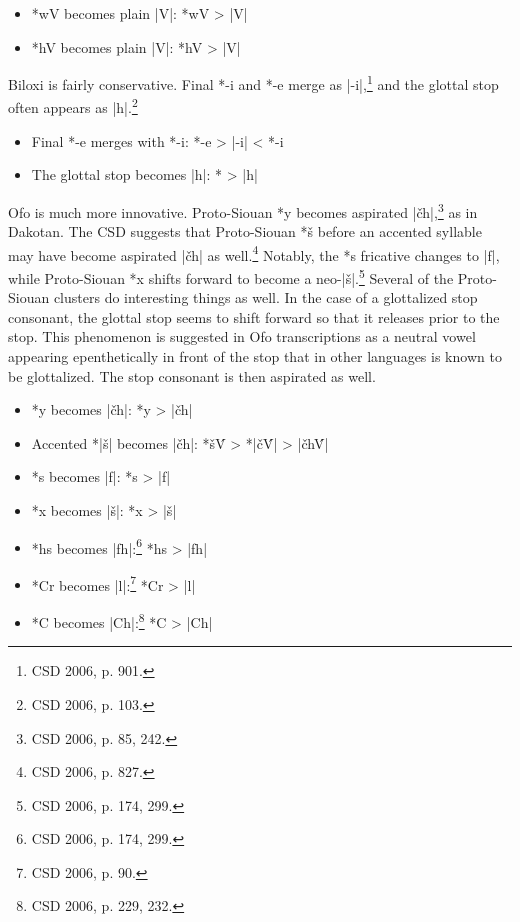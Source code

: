 \documentclass[output=paper]{LSP/langsci}
\begin{document}
\begin{itemize}
\item *wV becomes plain |V|: \hspace{1em} *wV	>	|V|
\item *hV becomes plain |V|: \hspace{1em} *hV	>	|V|
\end{itemize}


Biloxi is fairly conservative.  Final *-i and *-e merge as |-i|,\footnote{CSD 2006, p. 901.}  and the glottal stop often appears as |h|.\footnote{CSD 2006, p. 103.} 

\begin{itemize}
\item Final *-e merges with *-i: \hspace{2.1em} *-e	>	|-i|	<	*-i
\item The glottal stop becomes |h|: \hspace{1em} *\textsuperscript{}	>	|h|
\end{itemize}


Ofo is much more innovative.  Proto-Siouan *y becomes aspirated |\v{c}h|,\footnote{CSD 2006, p. 85, 242.} as in Dakotan.  The CSD suggests that Proto-Siouan *\v{s} before an accented syllable may have become aspirated |\v{c}h| as well.\footnote{CSD 2006, p. 827.} Notably, the *s fricative changes to |f|, while Proto-Siouan *x shifts forward to become a neo-|\v{s}|.\footnote{CSD 2006, p. 174, 299.} Several of the Proto-Siouan clusters do interesting things as well.  In the case of a glottalized stop consonant, the glottal stop seems to shift forward so that it releases prior to the stop.  This phenomenon is suggested in Ofo transcriptions as a neutral vowel appearing epenthetically in front of the stop that in other languages is known to be glottalized.  The stop consonant is then aspirated as well.

\begin{itemize}
\item *y becomes |\v{c}h|: \hspace{5em} *y	>	|\v{c}h|
\item Accented *|\v{s}| becomes |\v{c}h|: \hspace{1em} *\v{s}\'V	>	*|\v{c}\'V|	>	|\v{c}h\'V|
\item *s becomes |f|: \hspace{6em} *s	>	|f|
\item *x becomes |\v{s}|: \hspace{6em} 	*x	>	|\v{s}|
\item *hs becomes |fh|:\footnote{CSD 2006, p. 174, 299.}  \hspace{4.8em} 			*hs	>	|fh|
\item *Cr becomes |l|:\footnote{CSD 2006, p. 90.}  \hspace{5em} 			*Cr	>	|l|
\item *C\textsuperscript{} becomes |Ch|:\footnote{CSD 2006, p. 229, 232.}  \hspace{3.9em} *C\textsuperscript{}	>	|Ch|
\end{itemize}
\end{document}
